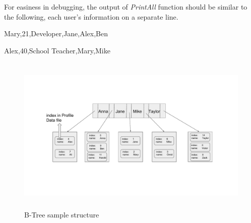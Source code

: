\documentclass[times, 12pt]{article}
\begin{document}
For easiness in debugging, the output of {\em PrintAll} function should be similar to the following, each user's information on a separate line.

Mary,21,Developer,Jane,Alex,Ben

Alex,40,School Teacher,Mary,Mike


\begin{figure}[H]
    \centering
    \includegraphics[width=7in,height=3in]{B-Tree_Sample}
    \caption{B-Tree sample structure}
    \label{fig:btree}
\end{figure}
\end{document}
